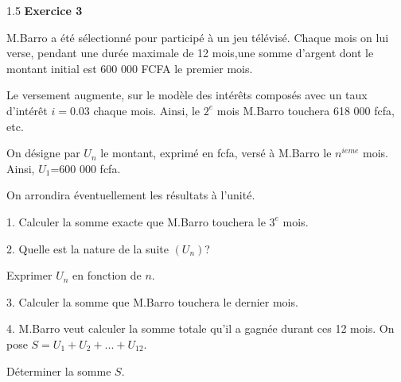 \documentclass[12pt]{article}
\begin{document}
\begin{spacing}{1.5}
\medskip\textbf{Exercice 3}

M.Barro a été sélectionné pour participé à un jeu télévisé. Chaque mois on lui verse, pendant une durée maximale de 12 mois,une somme d'argent dont le montant initial est 600 000 FCFA le premier mois.

 Le versement augmente, sur le modèle des intérêts composés avec un taux d'intérêt $i=0.03$ chaque mois. Ainsi, le $2^{e}$ mois M.Barro touchera 618 000 fcfa, etc. 
 
 On désigne par $U_n$ le montant, exprimé en fcfa, versé à M.Barro le $n^{ieme}$ mois. Ainsi, $U_1$=600 000 fcfa.
 
 On arrondira éventuellement les résultats à l'unité.

1. Calculer la somme exacte que M.Barro touchera le $3^{e}$ mois.

2. Quelle est la nature de la suite $(U_n)$? 

Exprimer $U_n$ en fonction de $ n$.

3. Calculer la somme que M.Barro touchera le dernier mois.

4. M.Barro veut calculer la somme totale qu'il a gagnée durant ces 12 mois. On pose $S=U_1+U_2+...+
 U_{12}$.

Déterminer la somme $S$.


\quad
\quad

\end{spacing}
\end{document}
